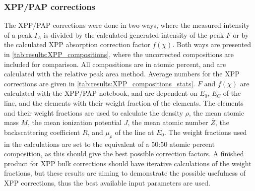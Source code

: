 








\subsubsection{XPP/PAP corrections}
\label{results:matrix_corrections:XPP}



The XPP/PAP corrections were done in two ways, where the measured intensity of a peak $I_A$ is divided by the calculated generated intensity of the peak $F$ or by the calculated XPP absorption correction factor $f(\chi)$.
Both ways are presented in \cref{tab:results:XPP_compositions}, where the uncorrected compositions are included for comparison.
All compositions are in atomic percent, and are calculated with the relative peak area method.
Average numbers for the XPP corrections are given in \cref{tab:results:XPP_compositions_stats}.
$F$ and $f(\chi)$ are calculated with the XPP/PAP notebook, and are dependent on $E_0$, $E_C$ of the line, and the elements with their weight fraction of the elements.
The elements and their weight fractions are used to calculate the density $\rho$, the mean atomic mass $M$, the mean ionization potential $J$, the mean atomic number $\bar{Z}$, the backscattering coefficient $R$, and $\mu_\rho$ of the line at $E_0$.
The weight fractions used in the calculations are set to the equivalent of a 50:50 atomic percent composition, as this should give the best possible correction factors.
A finished product for XPP bulk corrections should have iterative calculations of the weight fractions, but these results are aiming to demonstrate the possible usefulness of XPP corrections, thus the best available input parameters are used.




